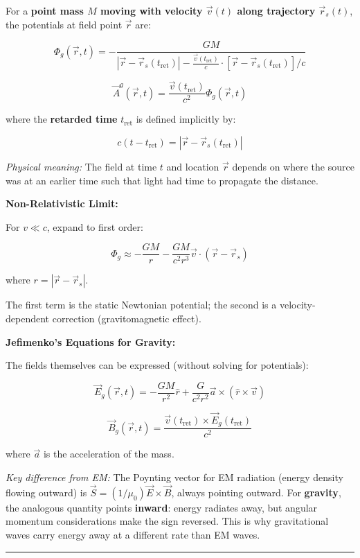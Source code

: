 \documentclass[
]{article}
\begin{document}
For a \textbf{point mass \(M\) moving with velocity \(\vec{v}(t)\) along
trajectory \(\vec{r}_s(t)\)}, the potentials at field point \(\vec{r}\)
are:

\[\Phi_g(\vec{r}, t) = -\frac{GM}{|\vec{r} - \vec{r}_s(t_{\text{ret}})| - \frac{\vec{v}(t_{\text{ret}})}{c} \cdot [\vec{r} - \vec{r}_s(t_{\text{ret}})]/c}\]

\[\vec{A}^g(\vec{r}, t) = \frac{\vec{v}(t_{\text{ret}})}{c^2} \Phi_g(\vec{r}, t)\]

where the \textbf{retarded time} \(t_{\text{ret}}\) is defined
implicitly by:

\[c(t - t_{\text{ret}}) = |\vec{r} - \vec{r}_s(t_{\text{ret}})|\]

\emph{Physical meaning:} The field at time \(t\) and location
\(\vec{r}\) depends on where the source was at an earlier time such that
light had time to propagate the distance.

\textbf{Non-Relativistic Limit:}

For \(v \ll c\), expand to first order:

\[\Phi_g \approx -\frac{GM}{r} - \frac{GM}{c^2 r^3} \vec{v} \cdot (\vec{r} - \vec{r}_s)\]

where \(r = |\vec{r} - \vec{r}_s|\).

The first term is the static Newtonian potential; the second is a
velocity-dependent correction (gravitomagnetic effect).

\textbf{Jefimenko's Equations for Gravity:}

The fields themselves can be expressed (without solving for potentials):

\[\vec{E}_g(\vec{r}, t) = -\frac{G M}{r^2} \hat{r} + \frac{G}{c^2 r^2} \vec{a} \times (\hat{r} \times \vec{v})\]

\[\vec{B}_g(\vec{r}, t) = \frac{\vec{v}(t_{\text{ret}}) \times \vec{E}_g(t_{\text{ret}})}{c^2}\]

where \(\vec{a}\) is the acceleration of the mass.

\emph{Key difference from EM:} The Poynting vector for EM radiation
(energy density flowing outward) is
\(\vec{S} = (1/\mu_0) \vec{E} \times \vec{B}\), always pointing outward.
For \textbf{gravity}, the analogous quantity points \textbf{inward}:
energy radiates away, but angular momentum considerations make the sign
reversed. This is why gravitational waves carry energy away at a
different rate than EM waves.

\begin{center}\rule{0.5\linewidth}{0.5pt}\end{center}
\end{document}

